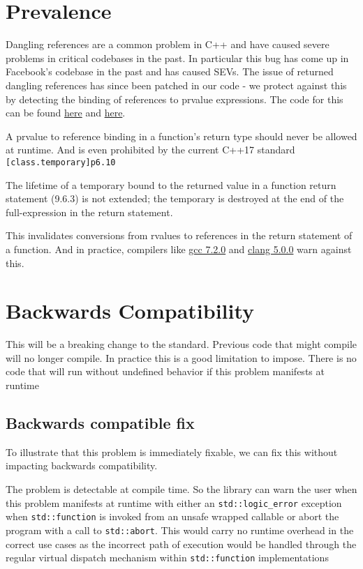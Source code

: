 \documentclass{article}
\begin{document}
\section{Prevalence}
Dangling references are a common problem in C++ and have caused severe
problems in critical codebases in the past.  In particular this bug has come
up in Facebook's codebase in the past and has caused SEVs.  The issue of
returned dangling references has since been patched in our code -
we protect against this by detecting the binding of references to prvalue
expressions.  The code for this can be found
\href{https://goo.gl/iyjDA9}{here} and \href{https://goo.gl/GAvi5j}{here}.

A prvalue to reference binding in a function's return type should never be
allowed at runtime.  And is even prohibited by the current C++17 standard
\texttt{[class.temporary]p6.10}
\begin{displayquote}
The lifetime of a temporary bound to the returned value in a function return
statement (9.6.3) is not extended; the temporary is destroyed at the end of
the full-expression in the return statement.
\end{displayquote}

This invalidates conversions from rvalues to references in the return
statement of a function.  And in practice, compilers like
\href{fucntio://wandbox.org/permlink/vRKLn2OoolPzeW44}{gcc 7.2.0} and
\href{https://wandbox.org/permlink/lOCOoY0qnSJwIQ8j}{clang 5.0.0} warn against
this.

\section{Backwards Compatibility}
This will be a breaking change to the standard.  Previous code that might
compile will no longer compile.  In practice this is a good limitation to
impose.  There is no code that will run without undefined behavior if this
problem manifests at runtime

\subsection{Backwards compatible fix}
To illustrate that this problem is immediately fixable, we can fix this
without impacting backwards compatibility.

The problem is detectable at compile time.  So the library can warn the user
when this problem manifests at runtime with either an
\texttt{std::logic\_error} exception when \texttt{std::function} is invoked
from an unsafe wrapped callable or abort the program with a call to
\texttt{std::abort}.  This would carry no runtime overhead in the correct use
cases as the incorrect path of execution would be handled through the regular
virtual dispatch mechanism within \texttt{std::function} implementations
\end{document}
